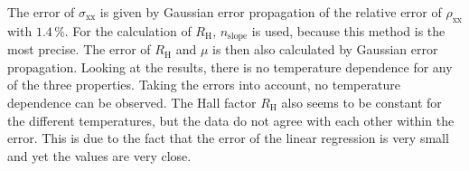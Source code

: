 The error of $\sigma_\text{xx}$ is given by Gaussian error propagation of the relative error of $\rho_\text{xx}$ with $1.4\,\%$.
For the calculation of $R_\text{H}$, $n_\text{slope}$ is used, because this method is the most precise.
The error of $R_\text{H}$ and $\mu$ is then also calculated by Gaussian error propagation.
Looking at the results, there is no temperature dependence for any of the three properties. 
Taking the errors into account, no temperature dependence can be observed. 
The Hall factor $R_\text{H}$ also seems to be constant for the different temperatures, 
but the data do not agree with each other within the error. 
This is due to the fact that the error of the linear regression is very small and yet the values are very close.
